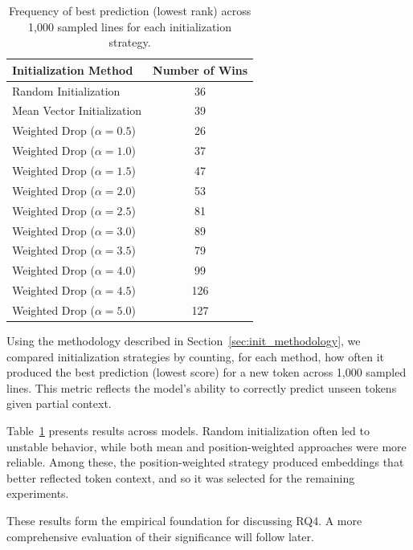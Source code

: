 \begin{table}[ht]
    \centering
    \begin{tabular}{l c}
        \toprule
        Initialization Method & Number of Wins \\
        \midrule
        Random Initialization & 36 \\
        Mean Vector Initialization & 39 \\
        Weighted Drop ($\alpha=0.5$) & 26 \\
        Weighted Drop ($\alpha=1.0$) & 37 \\
        Weighted Drop ($\alpha=1.5$) & 47 \\
        Weighted Drop ($\alpha=2.0$) & 53 \\
        Weighted Drop ($\alpha=2.5$) & 81 \\
        Weighted Drop ($\alpha=3.0$) & 89 \\
        Weighted Drop ($\alpha=3.5$) & 79 \\
        Weighted Drop ($\alpha=4.0$) & 99 \\
        Weighted Drop ($\alpha=4.5$) & 126 \\
        Weighted Drop ($\alpha=5.0$) & 127 \\
        \bottomrule
    \end{tabular}
    \caption{Frequency of best prediction (lowest rank) across 1,000 sampled lines for each initialization strategy.}
    \label{tab:embed_init_results}
\end{table}

Using the methodology described in Section~\ref{sec:init_methodology}, we compared initialization strategies by counting, for each method, how often it produced the best prediction (lowest score) for a new token across 1,000 sampled lines. This metric reflects the model’s ability to correctly predict unseen tokens given partial context.

Table~\ref{tab:embed_init_results} presents results across models. Random initialization often led to unstable behavior, while both mean and position-weighted approaches were more reliable. Among these, the position-weighted strategy produced embeddings that better reflected token context, and so it was selected for the remaining experiments.

These results form the empirical foundation for discussing RQ4. A more comprehensive evaluation of their significance will follow later.





